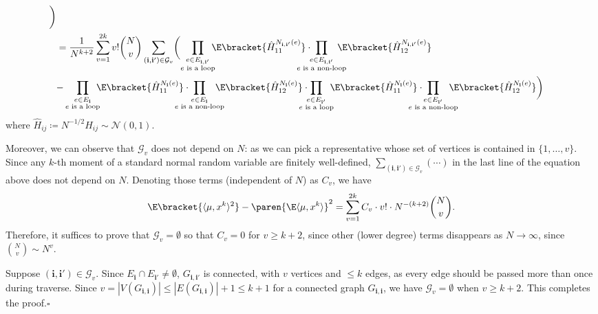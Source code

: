 \documentclass{homework}
\begin{document}
{\begin{align*}
        \biggr)
    \\ &= \frac 1 {N^{k + 2}} \sum_{v=1}^{2k} v!\binom N v \sum_{(\mathbf i,\mathbf i') \in \mathcal G_v} \biggl(
        \prod_{\substack{e\in E_{\mathbf i,\mathbf i'} \\ \text{$e$ is a loop}}}\mkern-10mu \E\bracket{ \hat H_{11}^{N_{\mathbf i,\mathbf i'} (e)} }\cdot \mkern-30mu\prod_{\substack{e\in E_{\mathbf i,\mathbf i'} \\ \text{$e$ is a non-loop}}} \mkern-20mu\E\bracket{ \hat H_{12}^{N_{\mathbf i,\mathbf i'} (e)} } \biggr.
        \\&\biggl. - 
        \prod_{\substack{e\in E_{\mathbf i} \\ \text{$e$ is a loop}}} \mkern-10mu\E\bracket{ \hat H_{11}^{N_{\mathbf i} (e)} }\cdot \mkern-30mu\prod_{\substack{e\in E_{\mathbf i} \\ \text{$e$ is a non-loop}}} \mkern-20mu\E\bracket{ \hat H_{12}^{N_{\mathbf i} (e)} }\cdot \mkern-20mu
        \prod_{\substack{e\in E_{\mathbf i'} \\ \text{$e$ is a loop}}}\mkern-10mu \E\bracket{ \hat H_{11}^{N_{\mathbf i} (e)} }\cdot \mkern-30mu\prod_{\substack{e\in E_{\mathbf i'} \\ \text{$e$ is a non-loop}}} \mkern-20mu\E\bracket{ \hat H_{12}^{N_{\mathbf i} (e)} }
        \biggr)
\end{align*}
where $\hat H_{ij} \coloneqq N^{-1/2}H_{ij}\sim \mathcal N(0,1)$.

Moreover, we can observe that $\mathcal G_v$ does not depend on $N$: as we can pick a representative whose set of vertices is contained in $\{1,\dots,v\}$. Since any $k$-th moment of a standard normal random variable are finitely well-defined, $\sum_{(\mathbf i,\mathbf i')\in \mathcal G_v} (\cdots)$ in the last line of the equation above does not depend on $N$. Denoting those terms (independent of $N$) as $C_v$, we have
$$ \E\bracket{\langle{\mu, x^k}\rangle^2} - \paren{\E\langle{\mu,x^k}\rangle}^2 = \sum_{v=1}^{2k} C_v\cdot v!\cdot N^{-(k+2)}\binom N v. $$
Therefore, it suffices to prove that $\mathcal G_v = \emptyset$ so that $C_v = 0$ for $v\ge k+2$, since other (lower degree) terms disappears as $N\to \infty$, since $\binom N v \sim N^{v}$.

Suppose $(\mathbf i, \mathbf i') \in \mathcal G_v$. Since $E_{\mathbf i} \cap E_{\mathbf i'}\ne\emptyset$, $G_{\mathbf i,\mathbf i'}$ is connected, with $v$ vertices and $\le k$ edges, as every edge should be passed more than once during traverse. Since $v = |V(G_{\mathbf i,\mathbf i})| \le |E(G_{\mathbf i,\mathbf i})| + 1 \le k+1$ for a connected graph $G_{\mathbf i,\mathbf i}$, we have $\mathcal G_v = \emptyset$ when $v \ge k+2$. This completes the proof.\hfill $\square$
}
\end{document}
